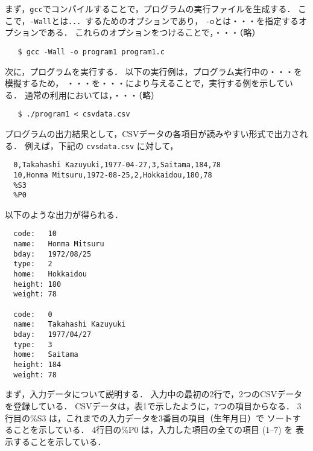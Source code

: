 まず，\verb|gcc|でコンパイルすることで，プログラムの実行ファイルを生成する．
ここで，\verb|-Wall|とは．．．するためのオプションであり，
\verb|-o|とは・・・を指定するオプションである．
これらのオプションをつけることで，・・・（略）

{\fontsize{10pt}{11pt} \selectfont
 \begin{verbatim}
   $ gcc -Wall -o program1 program1.c
 \end{verbatim}
}

次に，プログラムを実行する．
以下の実行例は，プログラム実行中の・・・を模擬するため，
・・・を・・・により与えることで，実行する例を示している．
通常の利用においては，・・・（略）

{\fontsize{10pt}{11pt} \selectfont
 \begin{verbatim}
   $ ./program1 < csvdata.csv
 \end{verbatim}
}

プログラムの出力結果として，CSVデータの各項目が読みやすい形式で出力される．
例えば，下記の \verb|cvsdata.csv| に対して，

{\fontsize{10pt}{11pt} \selectfont
 \begin{verbatim}
  0,Takahashi Kazuyuki,1977-04-27,3,Saitama,184,78
  10,Honma Mitsuru,1972-08-25,2,Hokkaidou,180,78
  %S3
  %P0
 \end{verbatim}
}

\noindent %
以下のような出力が得られる．

{\fontsize{10pt}{11pt} \selectfont
 \begin{verbatim}
  code:   10
  name:   Honma Mitsuru
  bday:   1972/08/25
  type:   2
  home:   Hokkaidou
  height: 180
  weight: 78

  code:   0
  name:   Takahashi Kazuyuki
  bday:   1977/04/27
  type:   3
  home:   Saitama
  height: 184
  weight: 78
 \end{verbatim}
}

まず，入力データについて説明する．
入力中の最初の2行で，2つのCSVデータを登録している．
CSVデータは，表1で示したように，7つの項目からなる．
3行目の\%S3 は，これまでの入力データを3番目の項目（生年月日）で
ソートすることを示している．
4行目の\%P0 は，入力した項目の全ての項目 ($1$--$7$) を
表示することを示している．


